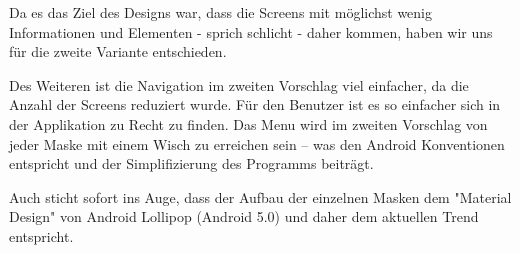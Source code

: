 Da es das Ziel des Designs war, dass die Screens mit möglichst wenig Informationen und Elementen - sprich schlicht - daher kommen, haben wir uns für die zweite Variante entschieden.

Des Weiteren ist die Navigation im zweiten Vorschlag viel einfacher, da die Anzahl der Screens reduziert wurde. Für den Benutzer ist es so einfacher sich in der Applikation zu Recht zu finden. Das Menu wird im zweiten Vorschlag von jeder Maske mit einem Wisch zu erreichen sein – was den Android Konventionen entspricht und der Simplifizierung des Programms beiträgt.

Auch sticht sofort ins Auge, dass der Aufbau der einzelnen Masken dem "Material Design" von Android Lollipop (Android 5.0) und daher dem aktuellen Trend entspricht.